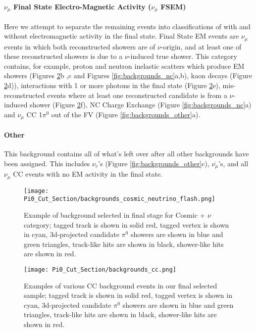 \documentclass{article}
\begin{document}
\paragraph{ $\nu_\mu$ Final State Electro-Magnetic Activity ($\nu_\mu$ FSEM)}
Here we attempt to separate the remaining events into classifications of with and without electromagnetic activity in the final state.  Final State EM events are $\nu_\mu$ events in which both reconstructed showers are of $\nu$-origin, and at least one of these reconstructed showers is due to a $\nu$-induced true shower. This category contains, for example, proton and neutron inelastic scatters which produce EM showers (Figures \ref{fig:backgrounds_cc}b ,c and Figures \ref{fig:backgrounds_nc}a,b), kaon decays (Figure \ref{fig:backgrounds_cc}d)),  interactions with 1 or more photons in the final state (Figure \ref{fig:backgrounds_cc}e), mis-reconstructed events where at least one reconstructed candidate is from a $\nu$-induced shower (Figure \ref{fig:backgrounds_cc}f), NC Charge Exchange (Figure \ref{fig:backgrounds_nc}a) and $\nu_\mu$ CC 1$\pi^0$ out of the FV (Figure \ref{fig:backgrounds_other}a).

\paragraph{Other}
This background contains all of what's left over after all other backgrounds have been assigned.  This includes $\nu_e$'s (Figure \ref{fig:backgrounds_other}c), $\overline{\nu_\mu}$'s, and all $\nu_\mu$ CC events with no EM activity in the final state.

\begin{figure}[h!]
\centering
\texttt{[image: Pi0\_Cut\_Section/backgrounds\_cosmic\_neutrino\_flash.png]}
\caption{ Example of background selected in final stage for Cosmic + $\nu$ category; tagged track is shown in solid red, tagged vertex is shown in cyan, 3d-projected candidate $\pi^0$ showers are shown in blue and green triangles, track-like hits are shown in black, shower-like hits are shown in red. }
\label{fig:backgrounds_cosmic_nuflash}
\end{figure}


\begin{figure}[h!]
\centering
\texttt{[image: Pi0\_Cut\_Section/backgrounds\_cc.png]}
\caption{ Examples of various CC background events in our final selected sample; tagged track is shown in solid red, tagged vertex is shown in cyan, 3d-projected candidate $\pi^0$ showers are shown in blue and green triangles, track-like hits are shown in black, shower-like hits are shown in red. }
\label{fig:backgrounds_cc}
\end{figure}
\end{document}
